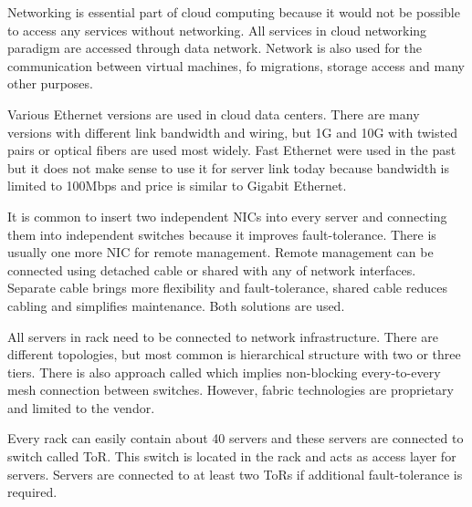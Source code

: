 
Networking is essential part of cloud computing because it would not be possible to access any services without networking. All services in cloud networking paradigm are accessed through data network. Network is also used for the communication between virtual machines, fo migrations, storage access and many other purposes.


Various Ethernet versions are used in cloud data centers. There are many versions with different link bandwidth and wiring, but 1G and 10G with twisted pairs or optical fibers are used most widely. Fast Ethernet were used in the past but it does not make sense to use it for server link today because bandwidth is limited to 100Mbps and price is similar to Gigabit Ethernet.

It is common to insert two independent \Ac{NIC}s into every server and connecting them into independent switches because it improves fault-tolerance. There is usually one more \Ac{NIC} for remote management. Remote management can be connected using detached cable or shared with any of network interfaces. Separate cable brings more flexibility and fault-tolerance, shared cable reduces cabling and simplifies maintenance. Both solutions are used. 

All servers in rack need to be connected to network infrastructure. There are different topologies, but most common is hierarchical structure with two or three tiers. \cite{survey-architectures} There is also approach called  which implies non-blocking every-to-every mesh connection between switches. However, fabric technologies are proprietary and limited to the vendor. 

Every rack can easily contain about 40 servers and these servers are connected to switch called \Ac{ToR}. This switch is located in the rack and acts as access layer for servers. Servers are connected to at least two \Ac{ToR}s if additional fault-tolerance is required. 


